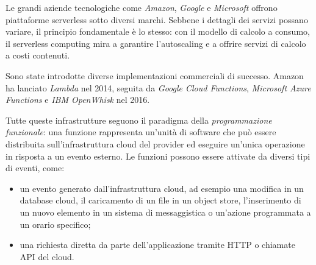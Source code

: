 Le grandi aziende tecnologiche come \textit{Amazon}, \textit{Google} e \textit{Microsoft} offrono piattaforme serverless sotto diversi marchi. Sebbene i dettagli dei servizi possano variare, il principio fondamentale è lo stesso: con il modello di calcolo a consumo, il serverless computing mira a garantire l'autoscaling e a offrire servizi di calcolo a costi contenuti.

Sono state introdotte diverse implementazioni commerciali di successo. Amazon ha lanciato \textit{Lambda} nel 2014, seguita da \textit{Google Cloud Functions}, \textit{Microsoft Azure Functions} e \textit{IBM OpenWhisk} nel 2016.\cite{shafiei2022serverless}

Tutte queste infrastrutture seguono il paradigma della \textit{programmazione funzionale}: una funzione rappresenta un'unità di software che può essere distribuita sull'infrastruttura cloud del provider ed eseguire un'unica operazione in risposta a un evento esterno. Le funzioni possono essere attivate da diversi tipi di eventi, come\cite{malawski2020serverless}:
\begin{itemize}
    \item un evento generato dall'infrastruttura cloud, ad esempio una modifica in un database cloud, il caricamento di un file in un object store, l'inserimento di un nuovo elemento in un sistema di messaggistica o un'azione programmata a un orario specifico;
    \item una richiesta diretta da parte dell'applicazione tramite HTTP o chiamate API del cloud.
\end{itemize}